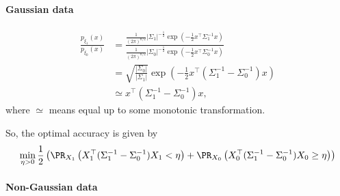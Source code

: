 \documentclass{article}
\begin{document}
\paragraph*{Gaussian data}
\begin{align*}
  \frac{ p_{\xi_1}(x) }{ p_{\xi_0}(x) }
  &= \frac{ \frac{1}{(2\pi)^{n/2}} |\Sigma_1|^{-\frac{1}{2}} \exp \left( -\frac{1}{2} x^\top \Sigma_1^{-1} x \right) }{ \frac{1}{(2\pi)^{n/2}} |\Sigma_0|^{-\frac{1}{2}} \exp \left( -\frac{1}{2} x^\top \Sigma_0^{-1} x \right) } \\
  &= \sqrt{ \frac{|\Sigma_0|}{|\Sigma_1|} } \exp \left( -\frac{1}{2} x^\top (\Sigma_1^{-1} - \Sigma_0^{-1}) x \right) \\
  &\simeq x^\top (\Sigma_1^{-1} - \Sigma_0^{-1}) x,
\end{align*}
where $\simeq$ means equal up to some monotonic transformation.

So, the optimal accuracy is given by
\begin{align*}
  \min_{\eta > 0} \frac{1}{2} \left( \PR_{X_1}\left( X_1^\top (\Sigma_1^{-1} - \Sigma_0^{-1}) X_1 < \eta \right) + \PR_{X_0} \left( X_0^\top (\Sigma_1^{-1} - \Sigma_0^{-1}) X_0 \geq \eta \right) \right)
\end{align*}


\paragraph*{Non-Gaussian data}



\end{document}
